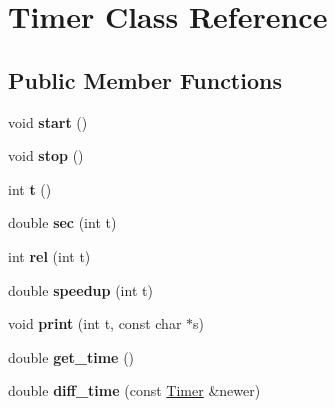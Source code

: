 \hypertarget{classTimer}{}\section{Timer Class Reference}
\label{classTimer}
\subsection*{Public Member Functions}
\begin{DoxyCompactItemize}
\item 
\hypertarget{classTimer_a3a8b5272198d029779dc9302a54305a8}{}void {\bfseries start} ()\label{classTimer_a3a8b5272198d029779dc9302a54305a8}

\item 
\hypertarget{classTimer_a63f0eb44b27402196590a03781515dba}{}void {\bfseries stop} ()\label{classTimer_a63f0eb44b27402196590a03781515dba}

\item 
\hypertarget{classTimer_ab6f9a39c25174859dfecfa39a68f7f43}{}int {\bfseries t} ()\label{classTimer_ab6f9a39c25174859dfecfa39a68f7f43}

\item 
\hypertarget{classTimer_ae6d3bb7d00da6bbd437f6ca7071aba32}{}double {\bfseries sec} (int t)\label{classTimer_ae6d3bb7d00da6bbd437f6ca7071aba32}

\item 
\hypertarget{classTimer_a0beb7ab925021d673e8f966e3ccd0d4b}{}int {\bfseries rel} (int t)\label{classTimer_a0beb7ab925021d673e8f966e3ccd0d4b}

\item 
\hypertarget{classTimer_a78110d5d942e202030f83306605a105a}{}double {\bfseries speedup} (int t)\label{classTimer_a78110d5d942e202030f83306605a105a}

\item 
\hypertarget{classTimer_aa7019966c58d6b716b2b43254ebca4e3}{}void {\bfseries print} (int t, const char $\ast$s)\label{classTimer_aa7019966c58d6b716b2b43254ebca4e3}

\item 
\hypertarget{classTimer_a71f709ed25564085ca99a184b3b09df8}{}double {\bfseries get\+\_\+time} ()\label{classTimer_a71f709ed25564085ca99a184b3b09df8}

\item 
\hypertarget{classTimer_af9ace9b280e5c9ea0da51a02fa8fd8ab}{}double {\bfseries diff\+\_\+time} (const \hyperlink{classTimer}{Timer} \&newer)\label{classTimer_af9ace9b280e5c9ea0da51a02fa8fd8ab}


\end{DoxyCompactItemize}
